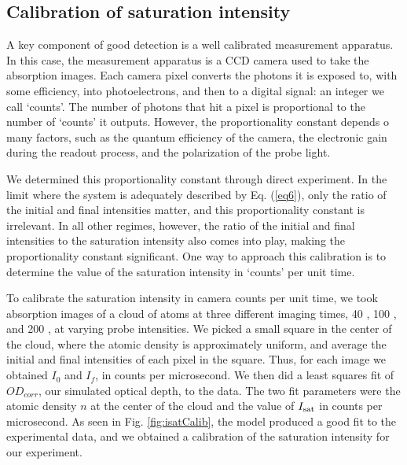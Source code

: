 \documentclass[12pt]{iopart}
\begin{document}
\subsection{Calibration of saturation intensity}
A key component of good detection is a well calibrated measurement apparatus. In this case, the measurement apparatus is a CCD camera used to take the absorption images.  Each camera pixel  converts the photons it is exposed to, with some efficiency, into photoelectrons, and then to a digital signal: an integer we  call  `counts'. The number of photons that hit a pixel is proportional to the number of `counts' it outputs. However, the proportionality constant depends o many factors, such as the quantum efficiency of the camera, the electronic gain during the readout process, and the polarization of the probe light. 
\par We determined this proportionality constant through direct experiment. In the limit where the system is adequately described by Eq. (\ref{eq6}), only the ratio of the initial and final intensities matter, and this proportionality constant is irrelevant. In all other regimes, however, the ratio of the initial and final intensities to the saturation intensity also comes into play, making the proportionality constant significant. One way to approach this calibration is to determine the value of the saturation intensity in `counts' per unit time. 
\par To calibrate the saturation intensity in camera counts per unit time, we took absorption images of a cloud of \K{} atoms at three different imaging times, 40 \us{}, 100 \us{}, and 200 \us{}, at varying probe intensities. We picked a small square in the center of the cloud, where the atomic density is approximately uniform, and average the initial and final intensities of each pixel in the square. Thus, for each image we obtained $I_0$ and $I_f$, in counts per microsecond. We then did a least squares fit of $OD_{corr}$, our simulated optical depth, to the data. The two fit parameters were the atomic density $n$ at the center of the cloud and the value of $I_{\rm{sat}}$ in counts per microsecond. As seen in Fig. \ref{fig:isatCalib}, the model produced a good fit to the experimental data, and we obtained a calibration of the saturation intensity for our experiment. 
\end{document}
